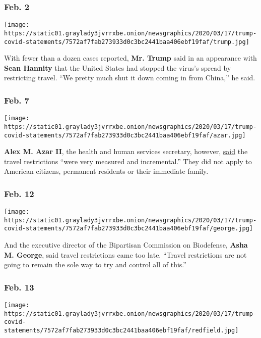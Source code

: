 \hypertarget{feb-2}{%
\subsubsection{Feb. 2}\label{feb-2}}

\texttt{[image: https://static01.graylady3jvrrxbe.onion/newsgraphics/2020/03/17/trump-covid-statements/7572af7fab273933d0c3bc2441baa406ebf19faf/trump.jpg]}

With fewer than a dozen cases reported, \textbf{Mr. Trump} said in an
appearance with \textbf{Sean Hannity} that the United States had stopped
the virus's spread by restricting travel. ``We pretty much shut it down
coming in from China,'' he said.

\hypertarget{feb-7}{%
\subsubsection{Feb. 7}\label{feb-7}}

\texttt{[image: https://static01.graylady3jvrrxbe.onion/newsgraphics/2020/03/17/trump-covid-statements/7572af7fab273933d0c3bc2441baa406ebf19faf/azar.jpg]}

\textbf{Alex M. Azar II}, the health and human services secretary,
however,
\href{https://www.youtube.com/watch?v=pdt2krYW4Fk\&feature=youtu.be\&t=2572}{said}
the travel restrictions ``were very measured and incremental.'' They did
not apply to American citizens, permanent residents or their immediate
family.

\hypertarget{feb-12}{%
\subsubsection{Feb. 12}\label{feb-12}}

\texttt{[image: https://static01.graylady3jvrrxbe.onion/newsgraphics/2020/03/17/trump-covid-statements/7572af7fab273933d0c3bc2441baa406ebf19faf/george.jpg]}

And the executive director of the Bipartisan Commission on Biodefense,
\textbf{Asha M. George}, said travel restrictions came too late.
``Travel restrictions are not going to remain the sole way to try and
control all of this.''

\hypertarget{feb-13}{%
\subsubsection{Feb. 13}\label{feb-13}}

\texttt{[image: https://static01.graylady3jvrrxbe.onion/newsgraphics/2020/03/17/trump-covid-statements/7572af7fab273933d0c3bc2441baa406ebf19faf/redfield.jpg]}

